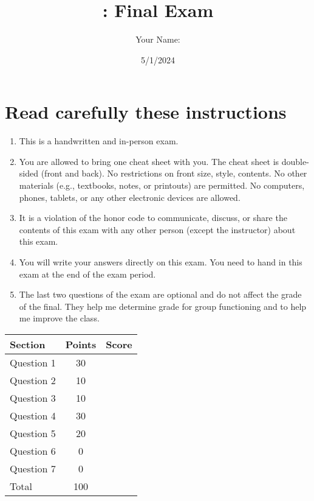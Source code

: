 \documentclass[10pt]{article}
\author{Your Name:}
\date{5/1/2024}
\title{\classname{}: Final Exam}
\begin{document}
\maketitle
\section*{Read carefully these instructions}

\begin{enumerate}
\item This is a handwritten and in-person exam. 

\item You are allowed to bring one cheat sheet with you. The cheat sheet is double-sided (front and back).  No restrictions on front size, style, contents.  No other materials (e.g., textbooks, notes, or printouts) are permitted. No computers, phones, tablets, or any other electronic devices are allowed.

\item It is a violation of the honor code to communicate, discuss, or share the contents of this exam with any other person (except the instructor) about this exam.

\item You will write your answers directly on this exam.  You need to hand in this exam at the end of the exam period. 

\item The last two questions of the exam are optional and do not affect the grade of the final.  They help me determine grade for group functioning and to help me improve the class.
  
\end{enumerate}


\begin{center}
  \begin{tabular}{lcc}
    \toprule
    Section		&	Points	&	Score \\
    \midrule
    Question 1	&	 30	& \\
    Question 2	&	 10	& \\
    Question 3 	&	 10	& \\
    Question 4 	&	 30	& \\
    Question 5 	&	 20	& \\
    Question 6 	&	 0	& \\
    Question 7 	&	 0	& \\
    \midrule
    Total		&	100	& \\
    \bottomrule
  \end{tabular}
\end{center}
\end{document}
